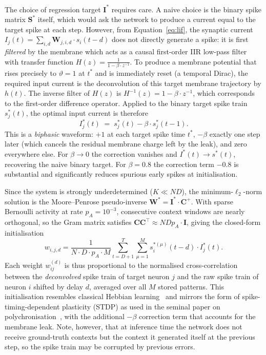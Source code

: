 \documentclass{article}
\begin{document}
The choice of regression target $\mathbf{I}^*$ requires care. A naive choice is the binary spike matrix $\mathbf{S}^*$ itself, which would ask the network to produce a current equal to the target spike at each step. However, from Equation~\ref{eq:lif}, the synaptic current $I_j(t) = \sum_{i,d} \mathbf{W}_{j,i,d} \cdot s_i(t-d)$ does not directly generate a spike: it is first \emph{filtered} by the membrane which acts as a causal first-order IIR low-pass filter with transfer function $H(z) = \frac{1}{1 - \beta \cdot z^{-1}}$.
To produce a membrane potential that rises precisely to $\vartheta=1$ at $t^*$ and is immediately reset (a temporal Dirac), the required input current is the deconvolution of this target membrane trajectory by $h(t)$. The inverse filter of $H(z)$ is $H^{-1}(z) = 1 - \beta \cdot z^{-1}$, which corresponds to the first-order difference operator. Applied to the binary target spike train $s^*_j(t)$, the optimal input current is therefore
 \begin{equation}
  I^*_j(t) \;=\; s^*_j(t) - \beta \cdot s^*_j(t-1).
  \label{eq:deconv_target}
\end{equation}
This is a \emph{biphasic} waveform: $+1$ at each target spike time $t^*$, $-\beta$ exactly one step later (which cancels the residual membrane charge left by the leak), and zero everywhere else. For $\beta \to 0$ the correction vanishes and $I^*(t) \to s^*(t)$, recovering the naive binary target. For $\beta = 0.8$ the correction term $-0.8$ is substantial and significantly reduces spurious early spikes at initialisation.
 
Since the system is strongly underdetermined ($K \ll ND$), the minimum-$\ell_2$-norm solution is the Moore--Penrose pseudo-inverse $\mathbf{W}^* = \mathbf{I}^* \cdot \mathbf{C}^+$. With sparse Bernoulli activity at rate $p_A = 10^{-3}$, consecutive context windows are nearly orthogonal, so the Gram matrix satisfies $\mathbf{C}\mathbf{C}^\top \approx NDp_A \cdot \mathbf{I}$, giving the closed-form initialisation
\begin{equation}
  w_{i, j, d}
  = \frac{1}{N \cdot D \cdot p_A \cdot M}
  \sum_{t=D+1}^{T}
  \sum_{\mu=1}^{M}
    s_i^{*(\mu)}(t-d)
    \cdot 
    I^*_j(t).
  \label{eq:init}
\end{equation}
Each weight $w_{ij}^{(d)}$ is thus proportional to the normalised cross-correlation between the \emph{deconvolved} spike train of target neuron $j$ and the raw spike train of neuron $i$ shifted by delay $d$, averaged over all $M$ stored patterns. This initialisation resembles classical Hebbian learning~\citep{Perrinet2002} and mirrors the form of spike-timing-dependent plasticity (STDP) as used in the seminal paper on polychronisation~\citep{Izhikevich2006}, with the additional $-\beta$ correction term that accounts for the membrane leak. Note, however, that at inference time the network does not receive ground-truth contexts but the context it generated itself at the previous step, so the spike train may be corrupted by previous errors.
\end{document}
